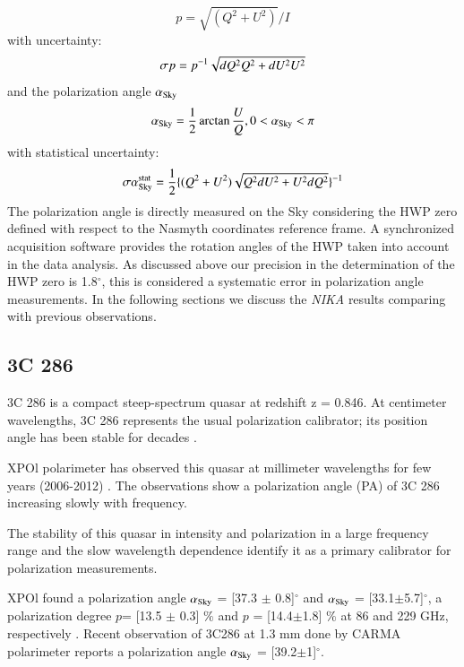 \documentclass[twocolumn,traditabstract]{aa}
\begin{document}
\begin{equation}
p = \sqrt{(Q^2 + U^2)}/I
\end{equation}
with uncertainty:
\begin{equation}
\sigma p = p^{\rm -1} \sqrt{dQ^2Q^2 + dU^2U^2}
\end{equation}
and the polarization angle $\alpha_{\rm Sky}$
\begin{equation}
\alpha_{\rm Sky} = \frac{1}{2} \arctan\frac{U}{Q} ,  0 < \alpha_{\rm Sky} < \pi
\end{equation}
with statistical uncertainty:
\begin{equation}
\sigma\alpha_{\rm Sky}^{\rm stat} = \frac{1}{2}\{(Q^2+U^2)\sqrt{Q^2dU^2 + U^2dQ^2}\}^{\rm -1}
\end{equation}
The polarization angle is directly measured on the Sky considering the HWP zero defined with respect to the Nasmyth coordinates reference frame. A synchronized acquisition software provides the rotation angles of the HWP taken into account in the data analysis. As discussed above our precision in the determination of the HWP zero is 1.8$^\circ$, this is considered a systematic error in polarization angle measurements.
In the following sections we discuss the {\it NIKA} results comparing with previous observations. 

\subsection{3C 286}
3C 286 is a compact  steep-spectrum quasar at redshift z = 0.846. At centimeter wavelengths, 3C 286 represents the usual polarization calibrator; its position angle has been stable for decades \citep{perley&butler}. 

XPOl  polarimeter \citep{thum2008} has observed this quasar  at millimeter wavelengths for few years (2006-2012)  \citep{xpol}. The observations show a polarization angle (PA) of 3C 286 increasing slowly with frequency. 

The stability of this quasar in intensity and polarization in a large frequency range and the slow wavelength dependence identify it as a primary calibrator for polarization measurements. 

XPOl found a polarization angle $\alpha_{\rm Sky}$ = [37.3 $\pm$ 0.8]$^\circ$ and  $\alpha_{\rm Sky}$ = [33.1$\pm$5.7]$^\circ$, a polarization degree $p$= [13.5 $\pm$ 0.3] $\%$ and $p$ = [14.4$\pm$1.8] $\%$ at 86 and 229 GHz, respectively \citep{xpol}. Recent observation of 3C286 at 1.3 mm done by CARMA polarimeter \citep{carma} reports a polarization angle $\alpha_{\rm Sky}$ = [39.2$\pm$1]$^\circ$. 
\end{document}
